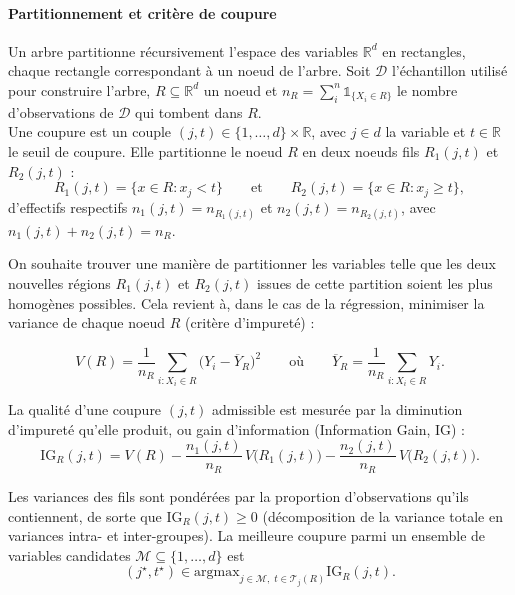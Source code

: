 \paragraph{Partitionnement et critère de coupure}
Un arbre partitionne récursivement l'espace des variables $\mathbb{R}^d$ en rectangles, chaque rectangle correspondant à un noeud de l'arbre. Soit $\mathcal{D}$ l'échantillon utilisé pour construire l'arbre, $R \subseteq \mathbb{R}^d$ un noeud et $n_R = \sum_{i}^n \mathds{1}_{\{X_i \in R\}}$ le nombre d'observations de $\mathcal{D}$ qui tombent dans $R$.\\

Une coupure est un couple $(j,t) \in \{1,\dots,d\} \times \mathbb{R}$, avec $j \in d$ la variable et $t \in \mathbb{R}$ le seuil de coupure. Elle partitionne le noeud $R$ en deux noeuds fils $R_1 (j,t)$ et $R_2(j,t)$ :
\[
R_1(j,t) = \{x \in R : x_j < t\}
\qquad\text{et}\qquad
R_2(j,t) = \{x \in R : x_j \ge t\},
\]
d'effectifs respectifs $n_1(j,t) = n_{R_1(j,t)}$ et $n_2(j,t) = n_{R_2(j,t)}$, avec $n_1(j,t) + n_2(j,t) = n_R$. 


On souhaite trouver une manière de partitionner les variables telle que les deux nouvelles régions $R_1 (j, t)$ et $R_2(j, t)$ issues de cette partition soient les plus homogènes possibles. Cela revient à, dans le cas de la régression, minimiser la variance de chaque noeud $R$ (critère d'impureté) :

\begin{equation}\label{eq:variance}
	V(R) = \frac{1}{n_R} \sum_{i : X_i \in R} \bigl(Y_i - \overline{Y}_R\bigr)^2
	\qquad\text{où}\qquad
	\overline{Y}_R = \frac{1}{n_R} \sum_{i : X_i \in R} Y_i .
\end{equation}

La qualité d'une coupure $(j,t)$ admissible est mesurée par la diminution d'impureté qu'elle produit, ou gain d'information (Information Gain, IG) :
\begin{equation}\label{eq:gain}
	\text{IG}_R(j,t) = V(R)
	- \frac{n_1(j,t)}{n_R}\, V\bigl(R_1(j,t)\bigr)
	- \frac{n_2(j,t)}{n_R}\, V\bigl(R_2(j,t)\bigr).
\end{equation}

Les variances des fils sont pondérées par la proportion d'observations qu'ils
contiennent, de sorte que $	\text{IG}_R(j,t) \ge 0$ (décomposition de la variance
totale en variances intra- et inter-groupes). La meilleure coupure parmi un
ensemble de variables candidates $\mathcal{M} \subseteq \{1,\dots,d\}$ est
\begin{equation}\label{eq:meilleure}
	(j^\star, t^\star) \in
	\text{argmax}_{j \in \mathcal{M},\; t \in \mathcal{T}_j(R)} 	\text{IG}_R(j,t).
\end{equation}

